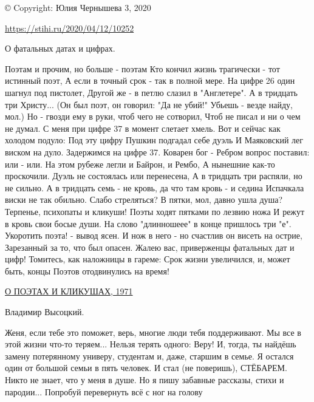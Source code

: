 \begin{itemize}
© Copyright: Юлия Чернышева 3, 2020\par

\url{https://stihi.ru/2020/04/12/10252}

 

О фатальных датах и цифрах.

\obeycr
Поэтам и прочим, но больше - поэтам
Кто кончил жизнь трагически - тот истинный поэт,
А если в точный срок - так в полной мере.
На цифре 26 один шагнул под пистолет,
Другой же - в петлю слазил в "Англетере".
А в тридцать три Христу... (Он был поэт, он говорил:
"Да не убий!" Убьешь - везде найду, мол.)
Но - гвозди ему в руки, чтоб чего не сотворил,
Чтоб не писал и ни о чем не думал.
С меня при цифре 37 в момент слетает хмель.
Вот и сейчас как холодом подуло:
Под эту цифру Пушкин подгадал себе дуэль
И Маяковский лег виском на дуло.
Задержимся на цифре 37. Коварен бог -
Ребром вопрос поставил: или - или.
На этом рубеже легли и Байрон, и Рембо,
А нынешние как-то проскочили.
Дуэль не состоялась или перенесена,
А в тридцать три распяли, но не сильно.
А в тридцать семь - не кровь, да что там кровь - и седина
Испачкала виски не так обильно.
Слабо стреляться? В пятки, мол, давно ушла душа?
Терпенье, психопаты и кликуши!
Поэты ходят пятками по лезвию ножа
И режут в кровь свои босые души.
На слово "длинношеее" в конце пришлось три "е".
Укоротить поэта! - вывод ясен.
И нож в него - но счастлив он висеть на острие,
Зарезанный за то, что был опасен.
Жалею вас, приверженцы фатальных дат и цифр!
Томитесь, как наложницы в гареме:
Срок жизни увеличился, и, может быть, концы
Поэтов отодвинулись на время!
\restorecr

\href{http://www.kulichki.com/vv/pesni/kto-konchil-zhizn-tragicheski.html}{%
О ПОЭТАХ И КЛИКУШАХ, 1971%
}

Владимир Высоцкий.

 

Женя, если тебе это поможет, верь, многие люди тебя поддерживают. Мы все в этой
жизни что-то теряем... Нельзя терять одного: Веру! И, тогда, ты найдёшь замену
потерянному универу, студентам и, даже, старшим в семье. Я остался один от
большой семьи в пять человек. И стал (не поверишь), СТЁБАРЕМ. Никто не знает,
что у меня в душе. Но я пишу забавные рассказы, стихи и пародии... Попробуй
перевернуть всё с ног на голову🥰🙃😍
\end{itemize}

